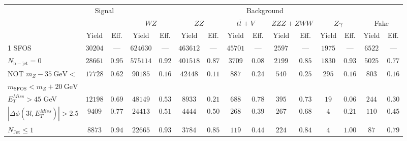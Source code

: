 \begin{tabular}{l||c|c||c|c||c|c||c|c||c|c||c|c||c|c}
\hline
 &\multicolumn{2}{c||}{Signal}            &  \multicolumn{12}{c}{Background}  \\
 & &  & \multicolumn{2}{c||}{$WZ$} & \multicolumn{2}{c||}{$ZZ$} & \multicolumn{2}{c||}{$t\bar{t}+V$} & \multicolumn{2}{c||}{$ZZZ+ZWW$} & \multicolumn{2}{c||}{$Z\gamma$} & \multicolumn{2}{c}{Fake} \\ 
 & Yield & Eff. & Yield & Eff. & Yield & Eff. & Yield & Eff. & Yield & Eff. & Yield & Eff. & Yield & Eff. \\
\hline\hline
1 SFOS &  $30204$ &  --- &  $624630$ &  --- &  $463612$ &  --- &  $45701$ &  --- &  $2597$ &  --- &  $1975$ &  --- &  $6522$ &  ---\\ 
\hline
$N_{\mathrm{b-jet}} = 0$ &  $28661$ &  $0.95$ &  $575114$ &  $0.92$ &  $401518$ &  $0.87$ &  $3709$ &  $0.08$ &  $2199$ &  $0.85$ &  $1830$ &  $0.93$ &  $5025$ &  $0.77$\\ 
\hline
NOT $m_Z - 35~\mathrm{GeV} <$  &  \multirow{2}{*}{$17728$} &  \multirow{2}{*}{$0.62$} &  \multirow{2}{*}{$90185$} &  \multirow{2}{*}{$0.16$} &  \multirow{2}{*}{$42448$} &  \multirow{2}{*}{$0.11$} &  \multirow{2}{*}{$887$} &  \multirow{2}{*}{$0.24$} &  \multirow{2}{*}{$540$} &  \multirow{2}{*}{$0.25$} &  \multirow{2}{*}{$295$} &  \multirow{2}{*}{$0.16$} &  \multirow{2}{*}{$803$} &  \multirow{2}{*}{$0.16$} \\ 
$ m_{\mathrm{SFOS}} < m_Z + 20~\mathrm{GeV}$  & & & & & & & & & & & & & & \\
\hline
$E_{T}^{Miss} > 45$ GeV &  $12198$ &  $0.69$ &  $48149$ &  $0.53$ &  $8933$ &  $0.21$ &  $688$ &  $0.78$ &  $395$ &  $0.73$ &  $19$ &  $0.06$ &  $244$ &  $0.30$\\ 
\hline
$|\Delta\phi(3l,E_{T}^{Miss})| > 2.5$ &  $9409$ &  $0.77$ &  $24413$ &  $0.51$ &  $4444$ &  $0.50$ &  $268$ &  $0.39$ &  $267$ &  $0.68$ &  $4$ &  $0.21$ &  $110$ &  $0.45$\\ 
\hline
$N_{\mathrm{Jet}} \leq 1$ &  $8873$ &  $0.94$ &  $22665$ &  $0.93$ &  $3784$ &  $0.85$ &  $119$ &  $0.44$ &  $224$ &  $0.84$ &  $4$ &  $1.00$ &  $87$ &  $0.79$\\ 
\hline
\end{tabular}
